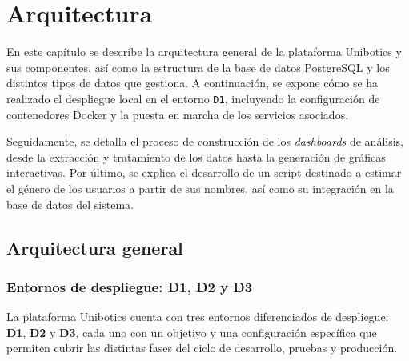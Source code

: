 \documentclass[a4paper, 12pt]{book}
\begin{document}

\chapter{Arquitectura}
\label{chap:diseño}

En este capítulo se describe la arquitectura general de la plataforma Unibotics y sus componentes, así como la estructura de la base de datos PostgreSQL y los distintos tipos de datos que gestiona. A continuación, se expone cómo se ha realizado el despliegue local en el entorno \texttt{D1}, incluyendo la configuración de contenedores Docker y la puesta en marcha de los servicios asociados.

Seguidamente, se detalla el proceso de construcción de los \textit{dashboards} de análisis, desde la extracción y tratamiento de los datos hasta la generación de gráficas interactivas. Por último, se explica el desarrollo de un script destinado a estimar el género de los usuarios a partir de sus nombres, así como su integración en la base de datos del sistema.

\section{Arquitectura general} 
\label{sec:arquitectura}

\subsection{Entornos de despliegue: D1, D2 y D3}
\label{subsec:entornosdespliegue}

La plataforma Unibotics cuenta con tres entornos diferenciados de despliegue: \textbf{D1}, \textbf{D2} y \textbf{D3}, cada uno con un objetivo y una configuración específica que permiten cubrir las distintas fases del ciclo de desarrollo, pruebas y producción.
\end{document}
